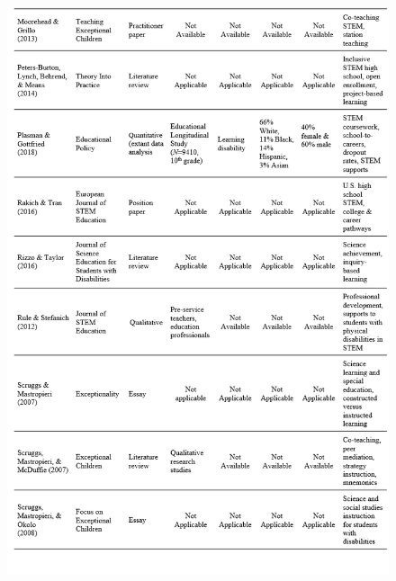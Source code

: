 \documentclass[11pt]{sig-alternate}
\begin{document}
\begin{large}
\begin{figure}[htp]
    \includegraphics[width=14cm]{Table1d.png}
\end{figure}
\newpage

\newpage
\newpage
\pagebreak
\clearpage
\begin{figure}[htp]


\end{figure}
\end{large}
\end{document}
